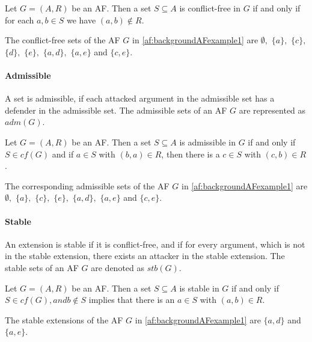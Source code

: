 \begin{definition}
    Let $G=(A,R)$ be an AF. Then a set $S \subseteq A$ is conflict-free in $G$ if and only if for each $a, b \in S$ we have $(a, b) \not\in R$.
\end{definition}

\begin{example}
    The conflict-free sets of the AF $G$ in \cref{af:backgroundAFexample1} are $\emptyset ,$
    $\{a\},$
    $\{c\},$
    $\{d\},$
    $\{e\},$
    $\{a, d\},$
    $\{a, e\}$ and
    $\{c, e\}$.
\end{example}





\paragraph{Admissible}  A set is admissible, if each attacked argument in the admissible set has a defender in the admissible set. The admissible sets of an AF $G$ are represented as $adm(G)$.


\begin{definition}
    Let $G=(A,R)$ be an AF. Then a set $S \subseteq A$ is admissible in $G$ if and only if $S \in cf(G)$ and if $a \in S$ with $(b, a) \in R$, then there is a $c \in S$ with $(c, b) \in R$.
\end{definition}
\begin{example}
        The corresponding admissible sets of the AF $G$ in \cref{af:backgroundAFexample1} are $\emptyset ,$
        $\{a\},$
        $\{c\},$
        $\{e\},$
        $\{a, d\},$
        $\{a, e\}$ and
        $\{c, e\}$.
\end{example}



\paragraph{Stable}  An extension is stable if it is conflict-free, and if for every argument, which is not in the stable extension, there exists an attacker in the stable extension. The stable sets of an AF $G$ are denoted as $stb(G)$.


\begin{definition}
    Let $G=(A,R)$ be an AF. Then a set  $S \subseteq A$ is stable in $G$ if and only if $S \in cf(G), and b \not\in S$ implies that there is an $a \in S$ with $(a, b) \in R$.
\end{definition}
\begin{example}
        The stable extensions of the AF $G$ in \cref{af:backgroundAFexample1} are
        $\{a, d\}$ and
        $\{a, e\}$.
\end{example}


